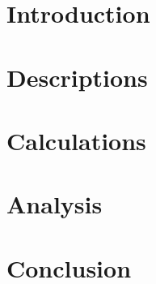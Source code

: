 \documentclass{article}
\begin{document}
\begin{titlepage}

\end{titlepage}
\section{Introduction}

\section{Descriptions}

\section{Calculations}

\section{Analysis}

\section{Conclusion}

\end{document}
